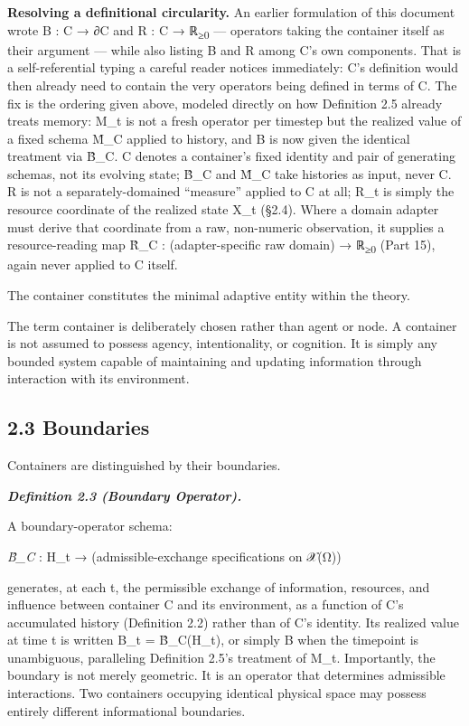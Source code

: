 \documentclass[
]{article}
\begin{document}
\textbf{Resolving a definitional circularity.} An earlier formulation of
this document wrote B : C → ∂C and R : C → ℝ\textsubscript{≥0} ---
operators taking the container itself as their argument --- while also
listing B and R among C's own components. That is a self-referential
typing a careful reader notices immediately: C's definition would then
already need to contain the very operators being defined in terms of C.
The fix is the ordering given above, modeled directly on how Definition
2.5 already treats memory: M\_t is not a fresh operator per timestep but
the realized value of a fixed schema M̂\_C applied to history, and B is
now given the identical treatment via B̂\_C. C denotes a container's
fixed identity and pair of generating schemas, not its evolving state;
B̂\_C and M̂\_C take histories as input, never C. R is not a
separately-domained ``measure'' applied to C at all; R\_t is simply the
resource coordinate of the realized state X\_t (§2.4). Where a domain
adapter must derive that coordinate from a raw, non-numeric observation,
it supplies a resource-reading map R̂\_C : (adapter-specific raw domain)
→ ℝ\textsubscript{≥0} (Part 15), again never applied to C itself.

The container constitutes the minimal adaptive entity within the theory.

The term container is deliberately chosen rather than agent or node. A
container is not assumed to possess agency, intentionality, or
cognition. It is simply any bounded system capable of maintaining and
updating information through interaction with its environment.

\hypertarget{boundaries}{%
\subsection{2.3 Boundaries}\label{boundaries}}

Containers are distinguished by their boundaries.

\emph{\textbf{Definition 2.3 (Boundary Operator).}}

A boundary-operator schema:

\emph{B̂\_C} : H\_t → (admissible-exchange specifications on 𝒳(Ω))

generates, at each t, the permissible exchange of information,
resources, and influence between container C and its environment, as a
function of C's accumulated history (Definition 2.2) rather than of C's
identity. Its realized value at time t is written B\_t = B̂\_C(H\_t), or
simply B when the timepoint is unambiguous, paralleling Definition 2.5's
treatment of M\_t. Importantly, the boundary is not merely geometric. It
is an operator that determines admissible interactions. Two containers
occupying identical physical space may possess entirely different
informational boundaries.
\end{document}
